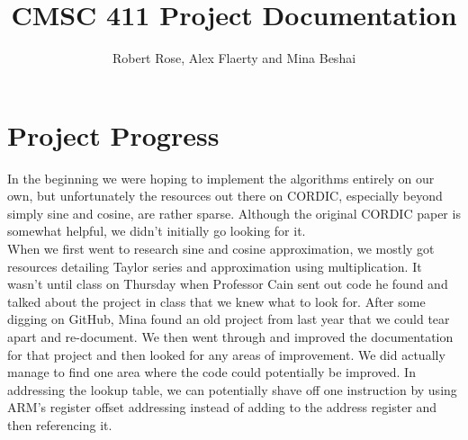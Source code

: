 \documentclass[11pt]{article}
\title{CMSC 411 Project Documentation}
\author{Robert Rose, Alex Flaerty and Mina Beshai}
\makeatletter
\let\inserttitle\@title
\let\insertauthor\@author
\makeatother
\begin{document}
\begin{center}
  \LARGE{\inserttitle}

  \Large{\insertauthor}
\end{center}

\section{Project Progress}

In the beginning we were hoping to implement the algorithms entirely on our own, but unfortunately 
the resources out there on CORDIC, especially beyond simply sine and cosine, are rather sparse.
Although the original CORDIC paper is somewhat helpful, we didn't initially go looking for 
it.\cite{volder1959cordic}\\

When we first went to research sine and cosine approximation, we mostly got resources detailing Taylor
series and approximation using multiplication.\cite{coranac} It wasn't until class on Thursday when
Professor Cain sent out code he found and talked about the project in class that we knew what to
look for.\cite{cainemail} After some digging on GitHub, Mina found an old project from last year that
we could tear apart and re-document.\cite{oldproj} We then went through and improved the documentation
for that project and then looked for any areas of improvement. We did actually manage to find one area
where the code could potentially be improved. In addressing the lookup table, we can potentially shave
off one instruction by using ARM's register offset addressing instead of adding to the address register
and then referencing it.\cite{registeroffsetmanual}




\printbibliography
\end{document}
